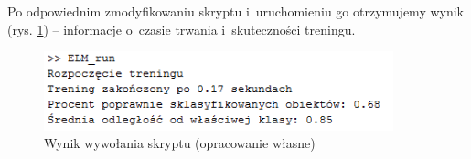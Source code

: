 \documentclass[pl]{minipw} %
\begin{document}
Po odpowiednim zmodyfikowaniu skryptu i~uruchomieniu go otrzymujemy wynik (rys. \ref{elm_run_result}) -- informacje o~czasie trwania i~skuteczności treningu.
\begin{figure}[H]
\centering
\includegraphics[width=0.9\textwidth]{elm_results.PNG}
\caption[Wynik wywołania skryptu]{Wynik wywołania skryptu (opracowanie własne)}
\label{elm_run_result}
\end{figure}
\end{document}
